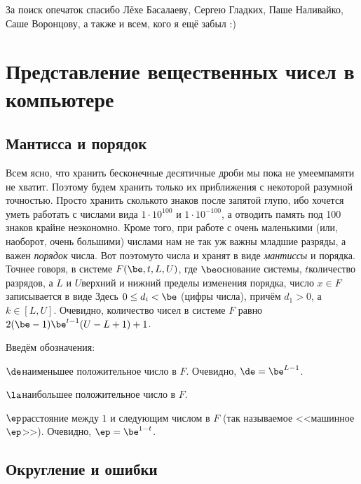 \documentclass[a4paper]{article}
\begin{document}
За поиск опечаток спасибо Лёхе Басалаеву, Сергею Гладких, Паше Наливайко, Саше Воронцову, а также  и всем, кого я ещё забыл :)

\medskip
\dmvntrail

\pagebreak

\section{Представление вещественных чисел в компьютере}

\subsection{Мантисса и порядок}

Всем ясно, что хранить бесконечные десятичные дроби мы пока не умеем\т памяти не хватит. Поэтому будем хранить
только их приближения с некоторой разумной точностью. Просто хранить сколько\д то знаков после запятой глупо, ибо хочется
уметь работать с числами вида $1\cdot 10^{100}$ и $1\cdot 10^{-100}$, а отводить память под 100 знаков крайне неэкономно.
Кроме того, при работе с очень маленькими (или, наоборот, очень большими) числами  нам не так уж важны младшие разряды, а
важен \emph{порядок} числа. Вот поэтому\д то числа и хранят в виде \emph{мантиссы} и порядка. Точнее говоря, в системе
$F(\be,t,L,U)$, где $\be$\т основание системы, $t$\т количество разрядов, а $L$ и $U$\т верхний и нижний пределы изменения
порядка, число $x \in F$ записывается в виде
Здесь $0\le d_i <\be$ (цифры числа), причём $d_1 >0$, а $k\in[L,U]$.
Очевидно, количество чисел в системе $F$ равно $2(\be-1)\be^{t-1}(U-L+1)+1$.

Введём обозначения:

\begin{items}{-2}
\item $\de$\т  наименьшее положительное число в $F$. Очевидно, $\de = \be^{L-1}$.
\item $\la$\т  наибольшее положительное число в $F$.
\item $\ep$\т расстояние между $1$ и следующим числом в $F$ (так называемое <<машинное $\ep$>>).
Очевидно, $\ep = \be^{1-t}$.
\end{items}

\subsection{Округление и ошибки}
\end{document}
